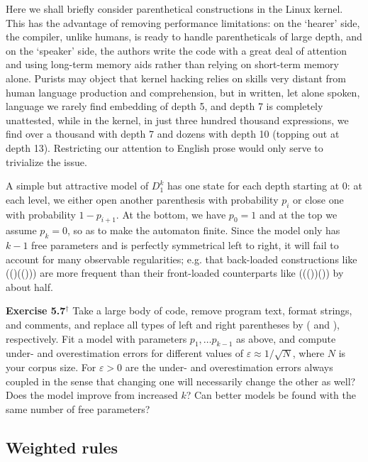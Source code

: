 Here we shall briefly consider parenthetical constructions in the Linux
kernel. This has the advantage of
removing performance limitations: on the `hearer' side, the compiler, unlike
humans, is ready to handle parentheticals of large depth, and on the `speaker'
side, the authors write the code with a great deal of attention and using
long-term memory aids rather than relying on short-term memory alone.  Purists
may object that kernel hacking relies on skills very distant from human
language production and comprehension, but in written, let alone spoken,
language we rarely find embedding of depth 5, and depth 7 is completely
unattested, while in the kernel, in just three hundred thousand expressions,
we find over a thousand with depth 7 and dozens with depth 10 (topping out at
depth 13). Restricting our attention to English prose would only serve to
trivialize the issue.

A simple but attractive model of $D_1^k$ has one state for each depth starting
at 0: at each level, we either open another parenthesis with probability $p_i$
or close one with probability $1-p_{i+1}$. At the bottom, we have $p_0=1$ and
at the top we assume $p_k=0$, so as to make the automaton finite. Since the
model only has $k-1$ free parameters and is perfectly symmetrical left to
right, it will fail to account for many observable regularities; e.g. that
back-loaded constructions like (()(())) are more frequent than their
front-loaded counterparts like ((())()) by about half.

\smallskip 
\noindent 
{\bf Exercise 5.7$^\dagger$} Take a large body of code, remove program text,
format strings, and comments, and replace all types of left and right
parentheses by ( and ), respectively. Fit a model with parameters $p_1, \ldots
p_{k-1}$ as above, and compute under- and overestimation errors for different
values of $\varepsilon \approx 1/\sqrt N$, where $N$ is your corpus size.  For
$\varepsilon > 0$ are the under- and overestimation errors always coupled in
the sense that changing one will necessarily change the other as well? Does
the model improve from increased $k$? Can better models be found with the same
number of free parameters?

\subsection{Weighted rules}

